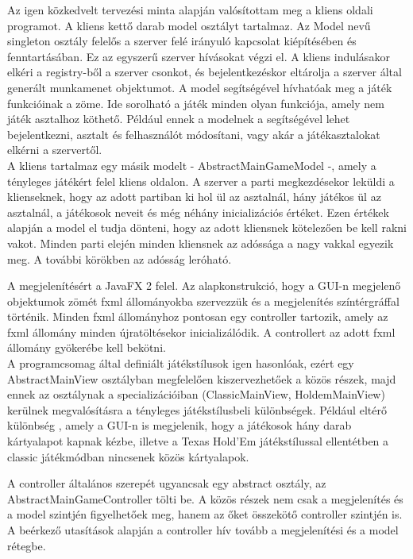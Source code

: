 Az igen közkedvelt tervezési minta alapján valósítottam meg a kliens oldali programot.
A kliens kettő darab model osztályt tartalmaz. Az Model nevű singleton osztály felelős a szerver felé irányuló kapcsolat kiépítésében és fenntartásában. Ez az egyszerű szerver hívásokat végzi el. A kliens indulásakor elkéri a registry-ből a szerver csonkot, és bejelentkezéskor eltárolja a szerver által generált munkamenet objektumot. A model segítségével hívhatóak meg a játék funkcióinak a zöme. Ide sorolható a játék minden olyan funkciója, amely nem játék asztalhoz köthető. Például ennek a modelnek a segítségével lehet bejelentkezni, asztalt és felhasználót módosítani, vagy akár a játékasztalokat elkérni a szervertől. \\
A kliens tartalmaz egy másik modelt - AbstractMainGameModel -, amely a tényleges játékért felel kliens oldalon. A szerver a parti megkezdésekor leküldi a klienseknek, hogy az adott partiban ki hol ül az asztalnál, hány játékos ül az asztalnál, a játékosok neveit és még néhány inicializációs értéket. Ezen értékek alapján a model el tudja dönteni, hogy az adott kliensnek kötelezően be kell rakni vakot. Minden parti elején minden kliensnek az adóssága a nagy vakkal egyezik meg. A további körökben az adósság leróható.

A megjelenítésért a JavaFX 2 \cite{javafx} felel. Az alapkonstrukció, hogy a GUI-n megjelenő objektumok zömét fxml állományokba szervezzük és a megjelenítés színtérgráffal történik. Minden fxml állományhoz pontosan egy controller tartozik, amely az fxml állomány minden újratöltésekor inicializálódik. A controllert az adott fxml állomány gyökerébe kell bekötni. \\
A programcsomag által definiált játékstílusok igen hasonlóak, ezért egy AbstractMainView osztályban megfelelően kiszervezhetőek a közös részek, majd ennek az osztálynak a specializációiban (ClassicMainView, HoldemMainView) kerülnek megvalósításra a tényleges játékstílusbeli különbségek. Például eltérő különbség , amely a GUI-n is megjelenik, hogy a játékosok hány darab kártyalapot kapnak kézbe, illetve a Texas Hold'Em játékstílussal ellentétben a classic játékmódban nincsenek közös kártyalapok.

A controller általános szerepét ugyancsak egy abstract osztály, az AbstractMainGameController tölti be. A közös részek nem csak a megjelenítés és a model szintjén figyelhetőek meg, hanem az őket összekötő controller szintjén is. A beérkező utasítások alapján a controller hív tovább a megjelenítési és a model rétegbe.

